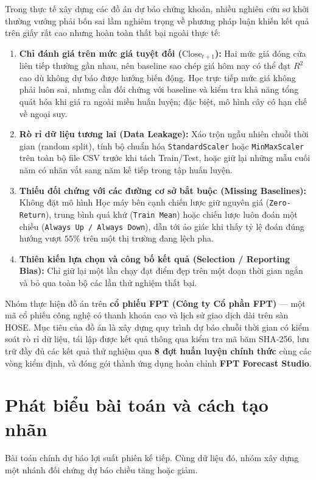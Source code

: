 \documentclass[12pt,a4paper]{report}
\begin{document}
Trong thực tế xây dựng các đồ án dự báo chứng khoán, nhiều nghiên cứu sơ khởi thường vướng phải bốn sai lầm nghiêm trọng về phương pháp luận khiến kết quả trên giấy rất cao nhưng hoàn toàn thất bại ngoài thực tế:
\begin{enumerate}
    \item \textbf{Chỉ đánh giá trên mức giá tuyệt đối ($\text{Close}_{t+1}$):} Hai mức giá đóng cửa liên tiếp thường gần nhau, nên baseline sao chép giá hôm nay có thể đạt $R^2$ cao dù không dự báo được hướng biến động. Học trực tiếp mức giá không phải luôn sai, nhưng cần đối chứng với baseline và kiểm tra khả năng tổng quát hóa khi giá ra ngoài miền huấn luyện; đặc biệt, mô hình cây có hạn chế về ngoại suy.
    \item \textbf{Rò rỉ dữ liệu tương lai (Data Leakage):} Xáo trộn ngẫu nhiên chuỗi thời gian (random split), tính bộ chuẩn hóa \texttt{StandardScaler} hoặc \texttt{MinMaxScaler} trên toàn bộ file CSV trước khi tách Train/Test, hoặc giữ lại những mẫu cuối năm có nhãn vắt sang năm kế tiếp trong tập huấn luyện.
    \item \textbf{Thiếu đối chứng với các đường cơ sở bắt buộc (Missing Baselines):} Không đặt mô hình Học máy bên cạnh chiến lược giữ nguyên giá (\nolinkurl{Zero-Return}), trung bình quá khứ (\texttt{Train Mean}) hoặc chiến lược luôn đoán một chiều (\texttt{Always Up / Always Down}), dẫn tới ảo giác khi thấy tỷ lệ đoán đúng hướng vượt $55\%$ trên một thị trường đang lệch pha.
    \item \textbf{Thiên kiến lựa chọn và công bố kết quả (Selection / Reporting Bias):} Chỉ giữ lại một lần chạy đạt điểm đẹp trên một đoạn thời gian ngắn và bỏ qua toàn bộ các lần thử nghiệm thất bại.
\end{enumerate}

Nhóm thực hiện đồ án trên \textbf{cổ phiếu FPT (Công ty Cổ phần FPT)} --- một mã cổ phiếu công nghệ có thanh khoản cao và lịch sử giao dịch dài trên sàn HOSE. Mục tiêu của đồ án là xây dựng quy trình dự báo chuỗi thời gian có kiểm soát rò rỉ dữ liệu, tái lập được kết quả thông qua kiểm tra mã băm SHA-256, lưu trữ đầy đủ các kết quả thử nghiệm qua \textbf{8 đợt huấn luyện chính thức} cùng các vòng kiểm định, và đóng gói thành ứng dụng hoàn chỉnh \textbf{FPT Forecast Studio}.

\section{Phát biểu bài toán và cách tạo nhãn}
Bài toán chính dự báo lợi suất phiên kế tiếp. Cùng dữ liệu đó, nhóm xây dựng một nhánh đối chứng dự báo chiều tăng hoặc giảm.
\end{document}
